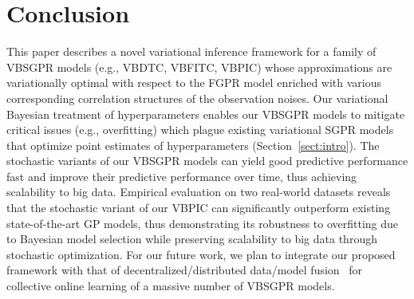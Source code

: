 \documentclass[conference]{IEEEtran}
\begin{document}
	\section{Conclusion}
	This paper describes a novel variational inference framework for a family of VBSGPR models (e.g., VBDTC, VBFITC, VBPIC) whose approximations are variationally optimal with respect to the FGPR model enriched with various corresponding correlation structures of the observation noises.
	Our variational Bayesian treatment of hyperparameters enables our VBSGPR models to mitigate critical issues (e.g., overfitting) which plague existing variational SGPR models that optimize point estimates of hyperparameters (Section~\ref{sect:intro}).	
The stochastic variants of our VBSGPR models can yield good predictive performance fast and improve their predictive performance over time, thus achieving scalability to big data.
	Empirical evaluation on two real-world datasets reveals that the stochastic variant of our VBPIC can significantly outperform existing state-of-the-art GP models, thus demonstrating its robustness to overfitting due to Bayesian model selection while preserving scalability to big data through stochastic optimization.	
	For our future work, we plan to integrate our proposed framework with that of decentralized/distributed data/model fusion~\cite{chen2013gaussian,LowTASE15,LowUAI12,NghiaAAAI19,Ruofei18} for collective online learning of a massive number of VBSGPR models. 


\end{document}
